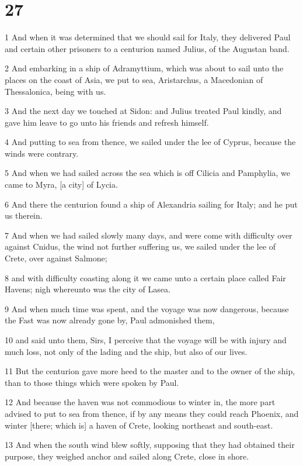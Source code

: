 \chapter{27}

\par 1 And when it was determined that we should sail for Italy, they delivered Paul and certain other prisoners to a centurion named Julius, of the Augustan band.
\par 2 And embarking in a ship of Adramyttium, which was about to sail unto the places on the coast of Asia, we put to sea, Aristarchus, a Macedonian of Thessalonica, being with us.
\par 3 And the next day we touched at Sidon: and Julius treated Paul kindly, and gave him leave to go unto his friends and refresh himself.
\par 4 And putting to sea from thence, we sailed under the lee of Cyprus, because the winds were contrary.
\par 5 And when we had sailed across the sea which is off Cilicia and Pamphylia, we came to Myra, [a city] of Lycia.
\par 6 And there the centurion found a ship of Alexandria sailing for Italy; and he put us therein.
\par 7 And when we had sailed slowly many days, and were come with difficulty over against Cnidus, the wind not further suffering us, we sailed under the lee of Crete, over against Salmone;
\par 8 and with difficulty coasting along it we came unto a certain place called Fair Havens; nigh whereunto was the city of Lasea.
\par 9 And when much time was spent, and the voyage was now dangerous, because the Fast was now already gone by, Paul admonished them,
\par 10 and said unto them, Sirs, I perceive that the voyage will be with injury and much loss, not only of the lading and the ship, but also of our lives.
\par 11 But the centurion gave more heed to the master and to the owner of the ship, than to those things which were spoken by Paul.
\par 12 And because the haven was not commodious to winter in, the more part advised to put to sea from thence, if by any means they could reach Phoenix, and winter [there; which is] a haven of Crete, looking northeast and south-east.
\par 13 And when the south wind blew softly, supposing that they had obtained their purpose, they weighed anchor and sailed along Crete, close in shore.
